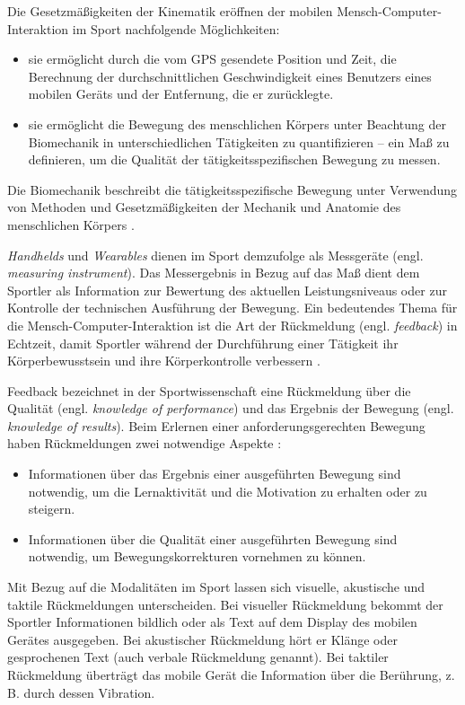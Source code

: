 Die Gesetzmäßigkeiten der Kinematik eröffnen der mobilen Mensch-Computer-Interaktion im Sport nachfolgende Möglichkeiten:

\begin{itemize}
	\item sie ermöglicht durch die vom \ac{GPS} gesendete Position und Zeit, die Berechnung der durchschnittlichen Geschwindigkeit eines Benutzers eines mobilen Geräts und der Entfernung, die er zurücklegte.
	\item sie ermöglicht die Bewegung des menschlichen Körpers unter Beachtung der Biomechanik in unterschiedlichen Tätigkeiten zu quantifizieren – ein Maß zu definieren, um die Qualität der tätigkeitsspezifischen Bewegung zu messen.
\end{itemize}

Die Biomechanik beschreibt die tätigkeitsspezifische Bewegung unter Verwendung von Methoden und Gesetzmäßigkeiten der Mechanik und Anatomie des menschlichen Körpers \citep[vgl.][ S.~2~ff.]{Winter2009}.

\emph{Handhelds} und \emph{Wearables} dienen im Sport demzufolge als Messgeräte (engl. \emph{measuring instrument}). Das Messergebnis in Bezug auf das Maß dient dem Sportler als Information zur Bewertung des aktuellen Leistungsniveaus oder zur Kontrolle der technischen Ausführung der Bewegung. Ein bedeutendes Thema für die Mensch-Computer-Interaktion ist die Art der Rückmeldung (engl. \emph{feedback}) in Echtzeit, damit Sportler während der Durchführung einer Tätigkeit ihr Körperbewusstsein und ihre Körperkontrolle verbessern \citep[vgl.][]{Nylander2014}.

Feedback bezeichnet in der Sportwissenschaft eine Rückmeldung über die Qualität (engl. \emph{knowledge of performance}) und das Ergebnis der Bewegung (engl. \emph{knowledge of results})\citep[vgl.][S.~482]{Riemer2015}. Beim Erlernen einer anforderungsgerechten Bewegung haben Rückmeldungen zwei notwendige Aspekte \citep[vgl.][S.~152]{Meinel2007}:

\begin{itemize}
	\item Informationen über das Ergebnis einer ausgeführten Bewegung sind notwendig, um die Lernaktivität und die Motivation zu erhalten oder zu steigern.
	\item Informationen über die Qualität einer ausgeführten Bewegung sind notwendig, um Bewegungskorrekturen vornehmen zu können.
\end{itemize}

Mit Bezug auf die Modalitäten im Sport lassen sich visuelle, akustische und taktile Rückmeldungen unterscheiden. Bei visueller Rückmeldung bekommt der Sportler Informationen bildlich oder als Text auf dem Display des mobilen Gerätes ausgegeben. Bei akustischer Rückmeldung hört er Klänge oder gesprochenen Text (auch verbale Rückmeldung genannt). Bei taktiler Rückmeldung überträgt das mobile Gerät die Information über die Berührung, z. B. durch dessen Vibration.

